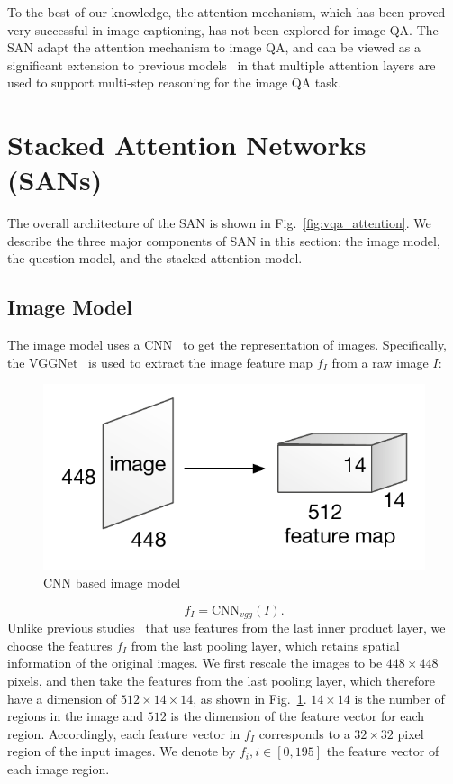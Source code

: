 \documentclass[10pt,twocolumn,letterpaper]{article}
\begin{document}
To the best of our knowledge, the attention mechanism, which has been proved
very successful in image captioning, has not been explored for image QA. The
SAN adapt the attention mechanism to image QA, and can be viewed as a
significant extension to previous models~\cite{xu2015show} in that multiple
attention layers are used to support multi-step reasoning for the image QA
task.

\vspace{-0.2cm}
\section{Stacked Attention Networks (SANs)}
\label{sec:model}

The overall architecture of the SAN is shown in
Fig.~\ref{fig:vqa_attention}. We describe the three major components of SAN in
this section: the image model, the question model, and the stacked attention
model.

\vspace{-0.2cm}
\subsection{Image Model}
The image model uses a CNN~\cite{krizhevsky2012imagenet, simonyan2014very,
  szegedy2014going} to get the representation of images. Specifically, the
VGGNet~\cite{simonyan2014very} is used to extract the image feature map $f_{I}$
from a raw image $I$:
\begin{figure}[tbh]
  \vspace{-0.5cm}
    \includegraphics[width=0.6\linewidth]{cnn_img.pdf}
    \centering
    \caption{CNN based image model}
    \label{fig:cnn_img}
  \vspace{-0.5cm}
\end{figure}

\begin{equation}
  f_{I} = \text{CNN}_{vgg}(I).
\end{equation}
Unlike previous studies~\cite{ren2015imageqa,ma2015learning,gao2015you} that
use features from the last inner product layer, we choose the features $f_{I}$
from the last pooling layer, which retains spatial information of the original
images. We first rescale the images to be $448\times 448$ pixels, and then take
the features from the last pooling layer, which therefore have a dimension of
$512\times 14\times 14$, as shown in Fig.~\ref{fig:cnn_img}. $14\times 14$ is
the number of regions in the image and $512$ is the dimension of the feature
vector for each region. Accordingly, each feature vector in $f_{I}$ corresponds
to a $32\times 32$ pixel region of the input images. We denote by
$f_i, i\in[0, 195]$ the feature vector of each image region.
\end{document}
